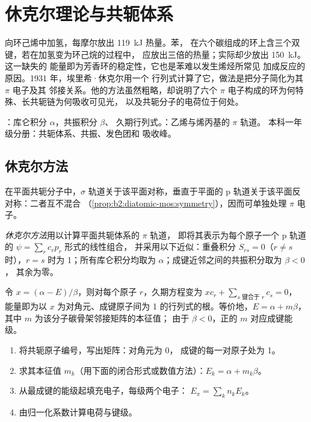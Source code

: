 \chapter{休克尔理论与共轭体系}\label{ch:b2:huckel}

向环己烯中加氢，每摩尔放出 \qty{119}{kJ} 热量。苯，
在六个碳组成的环上含三个双键，若在加氢变为环己烷的过程中，
应放出三倍的热量；实际却少放出 \qty{150}{kJ}。这一缺失的
能量即为芳香环的稳定性，它也是苯难以发生烯烃所常见
加成反应的原因。1931 年，埃里希·休克尔用一个
行列式计算了它，做法是把分子简化为其 $\pi$ 电子及其
邻接关系。他的方法虽然粗略，却说明了六个 $\pi$
电子构成的环为何特殊、长共轭链为何吸收可见光，
以及共轭分子的电荷位于何处。

\begin{recall}
：库仑积分 $\alpha$，共振积分 $\beta$、
久期行列式。：乙烯与烯丙基的 $\pi$ 轨道。
本科一年级分册：共轭体系、共振、发色团和
吸收峰。
\end{recall}

\section{休克尔方法}

在平面共轭分子中，$\sigma$ 轨道关于该平面对称，垂直于平面的 p
轨道关于该平面反对称：二者互不混合
（\cref{prop:b2:diatomic-mos:symmetry}），因而可单独处理 $\pi$
电子。

\begin{definition}[休克尔方法]\label{def:b2:huckel:method}
\emph{休克尔方法}用以计算平面共轭体系的 $\pi$ 轨道，
即将其表示为每个原子一个 p 轨道的 $\psi = \sum_r c_r p_r$ 形式的线性组合，
并采用以下近似：重叠积分 $S_{rs} = 0$（$r \neq s$ 时），$r =
s$ 时为 1；所有库仑积分均取为 $\alpha$；成键近邻之间的共振积分取为 $\beta < 0$，
其余为零。
\end{definition}

令 $x = (\alpha - E)/\beta$，则对每个原子 $r$，久期方程变为
$xc_r + \sum_{s \text{ 键合于 } r} c_s = 0$，
能量即为以 $x$ 为对角元、成键原子间为 1 的行列式的根。等价地，$E =
\alpha + m\beta$，其中 $m$ 为该分子碳骨架邻接矩阵的本征值；
由于 $\beta < 0$，正的 $m$ 对应成键能级。

\begin{method}[休克尔计算]\label{met:b2:huckel:huckel}
\begin{enumerate}
  \item 将共轭原子编号，写出矩阵：对角元为 0，
        成键的每一对原子处为 1。
  \item 求其本征值 $m_k$（用下面的闭合形式或数值方法）：$E_k =
        \alpha + m_k\beta$。
  \item 从最成键的能级起填充电子，每级两个电子：
        $E_\pi = \sum_k n_k E_k$。
  \item 由归一化系数计算电荷与键级。
\end{enumerate}
\end{method}

